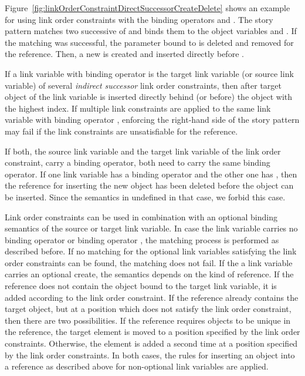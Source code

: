 {Figure~\ref{fig:linkOrderConstraintDirectSuccessorCreateDelete} shows an example for using link order constraints with the binding operators \create and \destroy. The story pattern matches two successive  of  and binds them to the object variables  and . If the matching was successful, the parameter bound to  is deleted and removed for the reference. Then, a new  is created and inserted directly before .

If a link variable with binding operator \create is the target link variable (or source link variable) of several \emph{indirect successor} link order constraints, then after target object of the link variable is inserted directly behind (or before) the object with the highest index. If  multiple link constraints are applied to the same link variable with binding operator \create, enforcing the right-hand side of the story pattern may fail if the link constraints are unsatisfiable for the reference.

If both, the source link variable and the target link variable of the link order constraint, carry a binding operator, both need to carry the same binding operator. If one link variable has a binding operator \create and the other one has \destroy, then the reference for inserting the new object has been deleted before the object can be inserted. Since the semantics in undefined in that case, we forbid this case.

Link order constraints can be used in combination with an optional binding semantics of the source or target link variable. In case the link variable carries no binding operator or binding operator \destroy, the matching process is performed as described before. If no matching for the optional link variables satisfying the link order constraints can be found, the matching does not fail. If the a link variable carries an optional create, the semantics depends on the kind of reference. If the reference does not contain the object bound to the target link variable, it is added according to the link order constraint. If the reference already contains the target object, but at a position which does not satisfy the link order constraint, then there are two possibilities.  If the reference requires objects to be unique in the reference, the target element is moved to a position specified by the link order constraints. Otherwise, the element is added a second time at a position specified by the link order constraints. In both cases, the rules for inserting an object into a reference as described above for non-optional link variables are applied.

}
